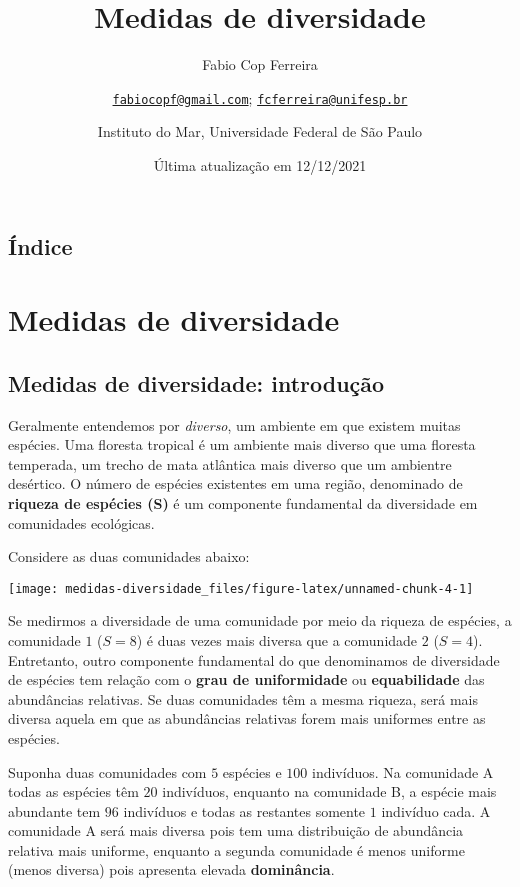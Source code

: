 \documentclass[
]{book}
\title{Medidas de diversidade}
\author{Fabio Cop Ferreira \and \href{mailto:fabiocopf@gmail.com}{\nolinkurl{fabiocopf@gmail.com}}; \href{mailto:fcferreira@unifesp.br}{\nolinkurl{fcferreira@unifesp.br}} \and Instituto do Mar, Universidade Federal de São Paulo}
\date{Última atualização em 12/12/2021}
\begin{document}
\maketitle

{
\setcounter{tocdepth}{1}
\tableofcontents
}
\hypertarget{uxedndice}{%
\chapter*{Índice}\label{uxedndice}}

\hypertarget{part-medidas-de-diversidade}{%
\part{Medidas de diversidade}\label{part-medidas-de-diversidade}}

\hypertarget{introdiversidade}{%
\chapter{Medidas de diversidade: introdução}\label{introdiversidade}}

Geralmente entendemos por \emph{diverso}, um ambiente em que existem muitas espécies. Uma floresta tropical é um ambiente mais diverso que uma floresta temperada, um trecho de mata atlântica mais diverso que um ambientre desértico. O número de espécies existentes em uma região, denominado de \textbf{riqueza de espécies (S)} é um componente fundamental da diversidade em comunidades ecológicas.

Considere as duas comunidades abaixo:

\begin{center}\texttt{[image: medidas-diversidade\_files/figure-latex/unnamed-chunk-4-1]} \end{center}

Se medirmos a diversidade de uma comunidade por meio da riqueza de espécies, a comunidade \(1\) (\(S = 8\)) é duas vezes mais diversa que a comunidade \(2\) (\(S = 4\)). Entretanto, outro componente fundamental do que denominamos de diversidade de espécies tem relação com o \textbf{grau de uniformidade} ou \textbf{equabilidade} das abundâncias relativas. Se duas comunidades têm a mesma riqueza, será mais diversa aquela em que as abundâncias relativas forem mais uniformes entre as espécies.

Suponha duas comunidades com \(5\) espécies e \(100\) indivíduos. Na comunidade A todas as espécies têm \(20\) indivíduos, enquanto na comunidade B, a espécie mais abundante tem \(96\) indivíduos e todas as restantes somente \(1\) indivíduo cada. A comunidade A será mais diversa pois tem uma distribuição de abundância relativa mais uniforme, enquanto a segunda comunidade é menos uniforme (menos diversa) pois apresenta elevada \textbf{dominância}.
\end{document}

